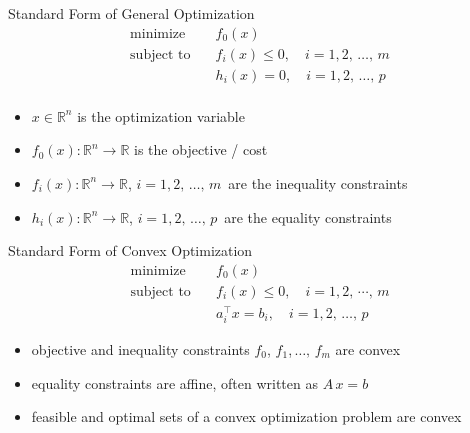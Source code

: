 \documentclass[10pt]{beamer}
\newcommand{\ds}{\displaystyle}
\theoremstyle{definition}
\begin{document}
\begin{frame}
  \begin{block}{Standard Form of General Optimization}
    \vspace{-5mm}
    \begin{align*}
      \text{minimize}\quad &f_0(x) \\
      \text{subject to}\quad &f_i(x)\leqslant 0, \quad i = 1, 2,\,\ldots,\,m \\
      \qquad\qquad &h_i(x) = 0, \quad i = 1, 2,\,\ldots,\,p \\
    \end{align*}

    \vspace{-9mm}
    \begin{itemize}
      \item $\ds x\in\mathbb{R}^n$ is the optimization variable
      \item $\ds f_0(x):\mathbb{R}^n\to\mathbb{R}$ is the objective / cost 
      \item $\ds f_i(x):\mathbb{R}^n\to\mathbb{R}$, $i = 1, 2,\,\ldots,\,m\,$ are the inequality constraints 
      \item $\ds h_i(x):\mathbb{R}^n\to\mathbb{R}$, $i = 1, 2,\,\ldots,\,p\,$ are the equality constraints 
    \end{itemize}
  \end{block}

  \begin{block}{Standard Form of Convex Optimization}
  \vspace{-5mm}
  \begin{align*}
    \text{minimize}\quad &f_0(x) \\
    \text{subject to}\quad &f_i(x)\leqslant 0, \quad i = 1, 2,\,\cdots,\,m \\
    \qquad\qquad &a_i^\top x = b_i, \quad i = 1, 2,\,\ldots,\,p
  \end{align*}
  \vspace{-8mm}
  \begin{itemize}
    \item objective and inequality constraints $f_0$, $f_1$,$\,\ldots,\,$$f_m$ are convex
    \item equality constraints are affine, often written as $\ds A\,x = b$
    \item feasible and optimal sets of a convex optimization problem are convex
  \end{itemize}
  \end{block}
\end{frame}
\end{document}
